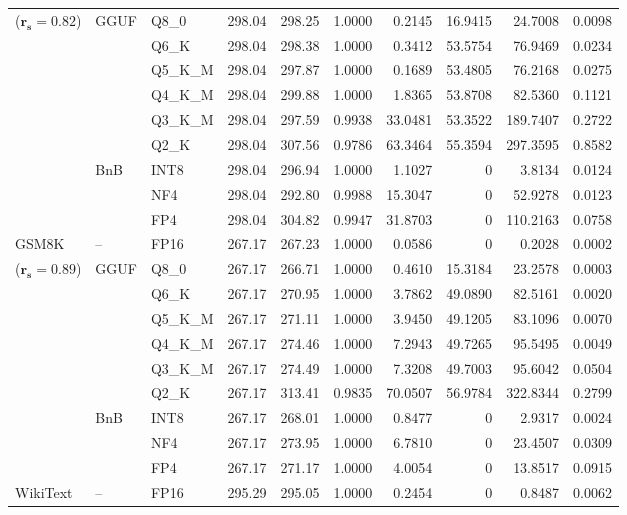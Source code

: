 \begin{longtable}{ll l rrrrrrr}
{\small ($\mathbf{r_s{=}0.82}$)} & GGUF & Q8\_0 & 298.04 & 298.25 & 1.0000 & 0.2145 & 16.9415 & 24.7008 & 0.0098 \\
 &  & Q6\_K & 298.04 & 298.38 & 1.0000 & 0.3412 & 53.5754 & 76.9469 & 0.0234 \\
 &  & Q5\_K\_M & 298.04 & 297.87 & 1.0000 & 0.1689 & 53.4805 & 76.2168 & 0.0275 \\
 &  & Q4\_K\_M & 298.04 & 299.88 & 1.0000 & 1.8365 & 53.8708 & 82.5360 & 0.1121 \\
 &  & Q3\_K\_M & 298.04 & 297.59 & 0.9938 & 33.0481 & 53.3522 & 189.7407 & 0.2722 \\
 &  & Q2\_K & 298.04 & 307.56 & 0.9786 & 63.3464 & 55.3594 & 297.3595 & 0.8582 \\
 & BnB & INT8 & 298.04 & 296.94 & 1.0000 & 1.1027 & \cellcolor{cyan!12} $0$ & 3.8134 & 0.0124 \\
 &  & NF4 & 298.04 & 292.80 & 0.9988 & 15.3047 & \cellcolor{cyan!12} $0$ & 52.9278 & 0.0123 \\
 &  & FP4 & 298.04 & 304.82 & 0.9947 & 31.8703 & \cellcolor{cyan!12} $0$ & 110.2163 & 0.0758 \\
\midrule
GSM8K & -- & FP16 & 267.17 & 267.23 & 1.0000 & 0.0586 & \cellcolor{cyan!12} $0$ & 0.2028 & 0.0002 \\
{\small ($\mathbf{r_s{=}0.89}$)} & GGUF & Q8\_0 & 267.17 & 266.71 & 1.0000 & 0.4610 & 15.3184 & 23.2578 & 0.0003 \\
 &  & Q6\_K & 267.17 & 270.95 & 1.0000 & 3.7862 & 49.0890 & 82.5161 & 0.0020 \\
 &  & Q5\_K\_M & 267.17 & 271.11 & 1.0000 & 3.9450 & 49.1205 & 83.1096 & 0.0070 \\
 &  & Q4\_K\_M & 267.17 & 274.46 & 1.0000 & 7.2943 & 49.7265 & 95.5495 & 0.0049 \\
 &  & Q3\_K\_M & 267.17 & 274.49 & 1.0000 & 7.3208 & 49.7003 & 95.6042 & 0.0504 \\
 &  & Q2\_K & 267.17 & 313.41 & 0.9835 & 70.0507 & 56.9784 & 322.8344 & 0.2799 \\
 & BnB & INT8 & 267.17 & 268.01 & 1.0000 & 0.8477 & \cellcolor{cyan!12} $0$ & 2.9317 & 0.0024 \\
 &  & NF4 & 267.17 & 273.95 & 1.0000 & 6.7810 & \cellcolor{cyan!12} $0$ & 23.4507 & 0.0309 \\
 &  & FP4 & 267.17 & 271.17 & 1.0000 & 4.0054 & \cellcolor{cyan!12} $0$ & 13.8517 & 0.0915 \\
\midrule
WikiText & -- & FP16 & 295.29 & 295.05 & 1.0000 & 0.2454 & \cellcolor{cyan!12} $0$ & 0.8487 & 0.0062 \\

\end{longtable}
